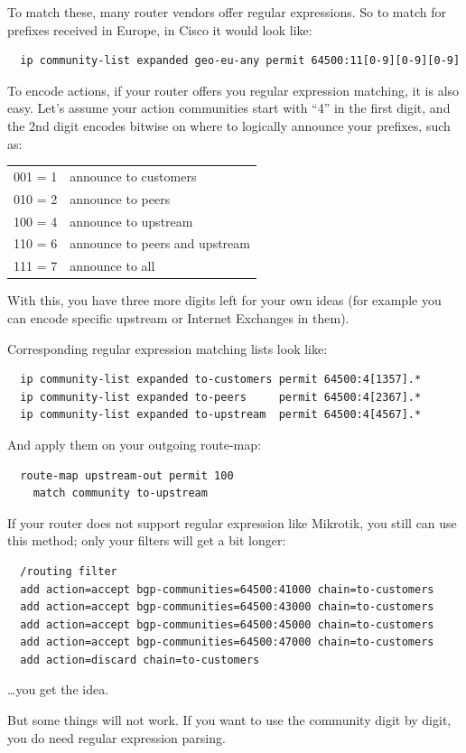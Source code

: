 To match these, many router vendors offer regular expressions. So to match for prefixes received in Europe, in Cisco it would look like:
\begin{verbatim}
  ip community-list expanded geo-eu-any permit 64500:11[0-9][0-9][0-9]
\end{verbatim}

To encode actions, if your router offers you regular expression matching, it is also easy. Let's assume your action communities start with ``4'' in the first digit, and the 2nd digit encodes bitwise on where to logically announce your prefixes, such as:

\begin{tabular}{rl}
  001 = 1 & announce to customers \\
  010 = 2 & announce to peers \\
  100 = 4 & announce to upstream \\
  110 = 6 & announce to peers and upstream \\
  111 = 7 & announce to all\\
\end{tabular}

With this, you have three more digits left for your own ideas (for example you can encode specific upstream or Internet Exchanges in them).

Corresponding regular expression matching lists look like:
\begin{verbatim}
  ip community-list expanded to-customers permit 64500:4[1357].*
  ip community-list expanded to-peers     permit 64500:4[2367].*
  ip community-list expanded to-upstream  permit 64500:4[4567].*
\end{verbatim}
And apply them on your outgoing route-map:
\begin{verbatim}
  route-map upstream-out permit 100
    match community to-upstream
\end{verbatim}

If your router does not support regular expression like Mikrotik, you still can use this method; only your filters will get a bit longer:
\begin{verbatim}
  /routing filter
  add action=accept bgp-communities=64500:41000 chain=to-customers
  add action=accept bgp-communities=64500:43000 chain=to-customers
  add action=accept bgp-communities=64500:45000 chain=to-customers
  add action=accept bgp-communities=64500:47000 chain=to-customers
  add action=discard chain=to-customers
\end{verbatim}
\ldots you get the idea.

But some things will not work. If you want to use the community digit by digit, you do need regular expression parsing.
